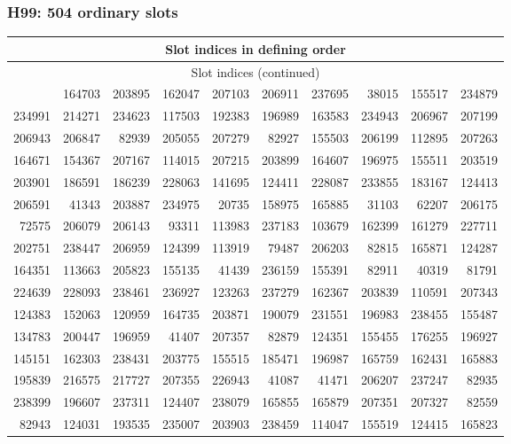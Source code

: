 \subsubsection*{H99: 504 ordinary slots}
{\scriptsize\setlength{\tabcolsep}{5pt}\begin{longtable}{rrrrrrrrrr}
\toprule\multicolumn{10}{c}{Slot indices in defining order}\\\midrule\endfirsthead
\toprule\multicolumn{10}{c}{Slot indices (continued)}\\\midrule\endhead
\bottomrule\endfoot
206191 & 164703 & 203895 & 162047 & 207103 & 206911 & 237695 & 38015 & 155517 & 234879\\
234991 & 214271 & 234623 & 117503 & 192383 & 196989 & 163583 & 234943 & 206967 & 207199\\
206943 & 206847 & 82939 & 205055 & 207279 & 82927 & 155503 & 206199 & 112895 & 207263\\
164671 & 154367 & 207167 & 114015 & 207215 & 203899 & 164607 & 196975 & 155511 & 203519\\
203901 & 186591 & 186239 & 228063 & 141695 & 124411 & 228087 & 233855 & 183167 & 124413\\
206591 & 41343 & 203887 & 234975 & 20735 & 158975 & 165885 & 31103 & 62207 & 206175\\
72575 & 206079 & 206143 & 93311 & 113983 & 237183 & 103679 & 162399 & 161279 & 227711\\
202751 & 238447 & 206959 & 124399 & 113919 & 79487 & 206203 & 82815 & 165871 & 124287\\
164351 & 113663 & 205823 & 155135 & 41439 & 236159 & 155391 & 82911 & 40319 & 81791\\
224639 & 228093 & 238461 & 236927 & 123263 & 237279 & 162367 & 203839 & 110591 & 207343\\
124383 & 152063 & 120959 & 164735 & 203871 & 190079 & 231551 & 196983 & 238455 & 155487\\
134783 & 200447 & 196959 & 41407 & 207357 & 82879 & 124351 & 155455 & 176255 & 196927\\
145151 & 162303 & 238431 & 203775 & 155515 & 185471 & 196987 & 165759 & 162431 & 165883\\
195839 & 216575 & 217727 & 207355 & 226943 & 41087 & 41471 & 206207 & 237247 & 82935\\
238399 & 196607 & 237311 & 124407 & 238079 & 165855 & 165879 & 207351 & 207327 & 82559\\
82943 & 124031 & 193535 & 235007 & 203903 & 238459 & 114047 & 155519 & 124415 & 165823\\

\end{longtable}}
